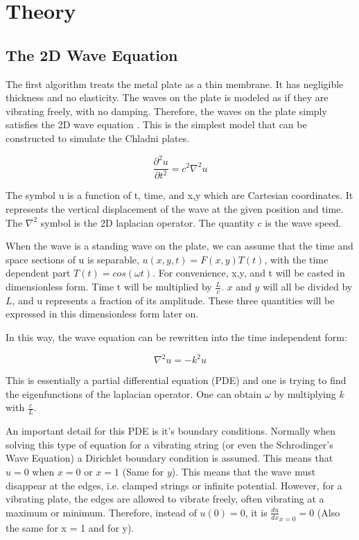 \section{Theory}

\subsection{The 2D Wave Equation}

The first algorithm treats the metal plate as a thin membrane. It has negligible thickness and no elasticity. The waves on the plate is modeled as if they are vibrating freely, with no damping. Therefore, the waves on the plate simply satisfies the 2D wave equation \autocite{PDE}. This is the simplest model that can be constructed to simulate the Chladni plates.

\begin{equation}
   \frac{\partial^2u}{\partial t^2} = c^2 \nabla^2u
\end{equation}

The symbol u is a function of t, time, and x,y which are Cartesian coordinates. It represents the vertical displacement of the wave at the given position and time. The $\nabla^2$ symbol is the 2D laplacian operator. The quantity $c$ is the wave speed.

When the wave is a standing wave on the plate, we can assume that the time and space sections of u is separable, $u(x,y,t) = F(x,y)T(t)$, with the time dependent part $T(t) = cos(\omega t)$. For convenience, x,y, and t will be casted in dimensionless form. Time t will be multiplied by $\frac{L}{c}$. $x$ and $y$ will all be divided by $L$, and u represents a fraction of its amplitude. These three quantities will be expressed in this dimensionless form later on.

In this way, the wave equation can be rewritten into the time independent form:

\begin{equation}
    \nabla^2 u = -k^2 u
\end{equation}

This is essentially a partial differential equation (PDE) and one is trying to find the eigenfunctions of the laplacian operator. One can obtain $\omega$ by multiplying $k$ with $\frac{c}{L}$.

An important detail for this PDE is it's boundary conditions. Normally when solving this type of equation for a vibrating string (or even the Schrodinger's Wave Equation) a Dirichlet boundary condition is assumed. This means that $u = 0$ when $x = 0$ or $x = 1$ (Same for $y$). This means that the wave must disappear at the edges, i.e. clamped strings or infinite potential. However, for a vibrating plate, the edges are allowed to vibrate freely, often vibrating at a maximum or minimum. Therefore, instead of $u(0) = 0$, it is $\frac{du}{dx}_{x=0} = 0$ (Also the same for x = 1 and for y).

